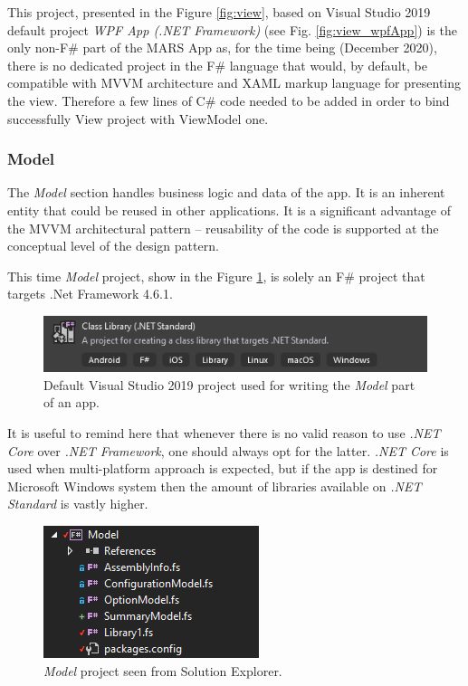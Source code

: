         \noindent
        This project, presented in the Figure \ref{fig:view}, based on Visual Studio 2019 default project \textit{WPF App (.NET Framework)} (see Fig. \ref{fig:view_wpfApp}) is the only non-F\# part of the MARS App as, for the time being (December 2020), there is no dedicated project in the F\# language that would, by default, be compatible with MVVM architecture and XAML markup language for presenting the view. Therefore a few lines of C\# code needed to be added in order to bind successfully View project with ViewModel one.
        

    \subsubsection{Model} 
        The \textit{Model} section handles business logic and data of the app. It is an inherent entity that could be reused in other applications. It is a significant advantage of the MVVM architectural pattern -- reusability of the code is supported at the conceptual level of the design pattern.
        
        This time \textit{Model} project, show in the Figure \ref{fig:model_VS19Project}, is solely an F\# project that targets .Net Framework 4.6.1.
        \begin{figure}[H]
            \centering
            \includegraphics{img/model_VS19Project.png}
            \caption{Default Visual Studio 2019 project used for writing the \textit{Model} part of an app.}
            \label{fig:model_VS19Project}
        \end{figure}
        
        It is useful to remind here that whenever there is no valid reason to use \textit{.NET Core} over \textit{.NET Framework}, one should always opt for the latter. \textit{.NET Core} is used when multi-platform approach is expected, but if the app is destined for Microsoft Windows system then the amount of libraries available on \textit{.NET Standard} is vastly higher.
        
        \begin{figure}[H]
            \centering
            \includegraphics{img/model.png}
            \caption{\textit{Model} project seen from Solution Explorer.}
            \label{fig:model}
        \end{figure} 
        
